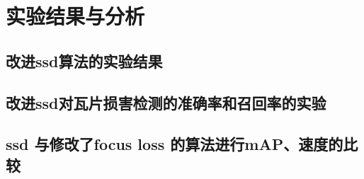 \section{实验结果与分析}
\setcounter{figure}{0}

\subsection{改进ssd算法的实验结果}

\subsection{改进ssd对瓦片损害检测的准确率和召回率的实验}

\subsection{ssd 与修改了focus loss 的算法进行mAP、速度的比较}


